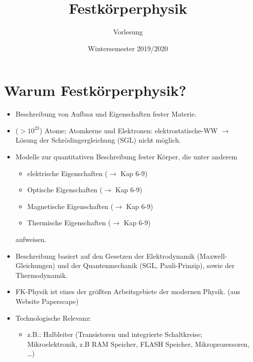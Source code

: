 


\title{Festkörperphysik}
\author{Vorlesung}
\date{Wintersemester 2019/2020}



\maketitle \newpage
\tableofcontents
\newpage

\section*{Warum Festkörperphysik?}
	\begin{itemize}
	    \item Beschreibung von Aufbau und Eigenschaften fester Materie.
	    \item ($>10^{23}$) Atome; Atomkerne und Elektronen: elektrostatische-WW $ \rightarrow $ Lösung der Schrödingergleichung (SGL) nicht möglich.
	    \item Modelle zur quantitativen Beschreibung fester Körper, die unter anderem
	    \begin{itemize}
	        \item elektrische Eigenschaften ($\rightarrow$ Kap 6-9)%
	        \item Optische Eigenschaften ($\rightarrow$ Kap 6-9)%
	        \item Magnetische Eigenschaften ($\rightarrow$ Kap 6-9)%
	        \item Thermische Eigenschaften ($\rightarrow$ Kap 6-9)%
	    \end{itemize}
    	aufweisen.
	    \item Beschreibung basiert auf den Gesetzen der Elektrodynamik (Maxwell-Gleichungen) und der Quantenmechanik (SGL, Pauli-Prinzip), sowie der Thermodynamik.
	    \item FK-Physik ist eines der größten Arbeitsgebiete der modernen Physik. (aus Website Paperscape)
	    \item Technologische Relevanz:
	    \begin{itemize}
	        \item z.B.: Halbleiter (Transistoren und integrierte Schaltkreise; Mikroelektronik, z.B RAM Speicher, FLASH Speicher, Mikroprozessoren, \dots)

\end{itemize}
\end{itemize}

